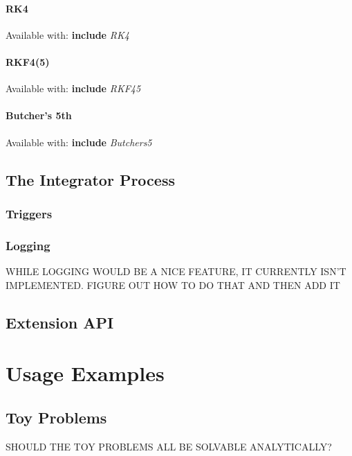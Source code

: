 \documentclass[letterpaper,10pt]{book}
\newcommand{\srcas}[1]{\textbf{include} \textlangle{}\textit{#1}\textrangle{}}
\begin{document}
    
      \subsection{RK4}
    	Available with: \srcas{RK4}

    
      \subsection{RKF4(5)}
	Available with: \srcas{RKF45}
    

      \subsection{Butcher's 5th}
	Available with: \srcas{Butchers5}
    
    

  \chapter{The Integrator Process}
    
    \section{Triggers}
    
    \section{Logging}
    WHILE LOGGING WOULD BE A NICE FEATURE, IT CURRENTLY ISN'T IMPLEMENTED.  FIGURE OUT HOW TO DO THAT AND THEN ADD IT

  \chapter{Extension API}

  
\part{Usage Examples}

  \chapter{Toy Problems}
    SHOULD THE TOY PROBLEMS ALL BE SOLVABLE ANALYTICALLY?
    
\end{document}
